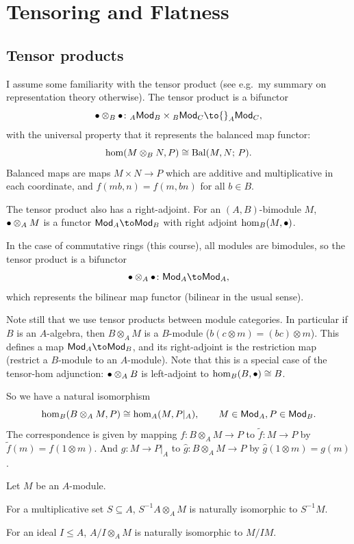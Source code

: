 \section{Tensoring and Flatness}

\subsection{Tensor products}

I assume some familiarity with the tensor product (see e.g.\ my summary on representation theory otherwise).
The tensor product is a bifunctor
$$ \bul\otimes_B\bul\colon {}_A\Mod_B\times{}_B\Mod_C \to {}_A\Mod_C , $$
with the universal property that it represents the balanced map functor:
$$ \hom(M\otimes_BN,P) \cong {\rm Bal}(M,N;\,P) . $$
Balanced maps are maps $M\times N\to P$ which are additive and multiplicative in each coordinate, and $f(mb,n)=f(m,bn)$ for all $b\in B$.

The tensor product also has a right-adjoint.
For an $(A,B)$-bimodule $M$, $\bullet\otimes_AM$ is a functor $\Mod_A\to\Mod_B$ with right adjoint $\hom_B(M,\bullet)$.

In the case of commutative rings (this course), all modules are bimodules, so the tensor product is a bifunctor
$$ \bul\otimes_A\bul\colon \Mod_A\to\Mod_A, $$
which represents the bilinear map functor (bilinear in the usual sense).

Note still that we use tensor products between module categories.
In particular if $B$ is an $A$-algebra, then $B\otimes_AM$ is a $B$-module ($b(c\otimes m)=(bc)\otimes m$).
This defines a map $\Mod_A\to\Mod_B$, and its right-adjoint is the restriction map (restrict a $B$-module to an $A$-module).
Note that this is a special case of the tensor-hom adjunction: $\bullet\otimes_AB$ is left-adjoint to $\hom_B(B,\bullet)\cong B$.

So we have a natural isomorphism
$$ \hom_B(B\otimes_AM,P) \cong \hom_A(M,P|_A),\qquad M\in{\sf Mod}_A, P\in{\sf Mod}_B . $$
The correspondence is given by mapping $f\colon B\otimes_AM\to P$ to $\tilde f\colon M\to P$ by $\tilde f(m)=f(1\otimes m)$.
And $g\colon M\to P|_A$ to $\hat g\colon B\otimes_AM\to P$ by $\hat g(1\otimes m)=g(m)$.

\bprop

    Let $M$ be an $A$-module.
    \benum
        \item For a multiplicative set $S\subseteq A$, $S^{-1}A\otimes_AM$ is naturally isomorphic to $S^{-1}M$.
        \item For an ideal $I\leq A$, $A/I\otimes_AM$ is naturally isomorphic to $M/IM$.
    \eenum

